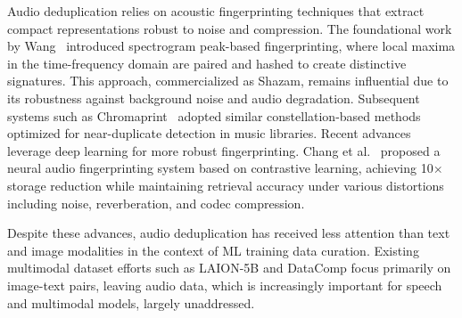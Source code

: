 \documentclass[sigconf, nonacm]{acmart}
\begin{document}
Audio deduplication relies on acoustic fingerprinting techniques that extract compact representations robust to noise and compression. The foundational work by Wang~\cite{wang2003industrial} introduced spectrogram peak-based fingerprinting, where local maxima in the time-frequency domain are paired and hashed to create distinctive signatures. This approach, commercialized as Shazam, remains influential due to its robustness against background noise and audio degradation. Subsequent systems such as Chromaprint~\cite{chromaprint} adopted similar constellation-based methods optimized for near-duplicate detection in music libraries. Recent advances leverage deep learning for more robust fingerprinting. Chang et al.~\cite{chang2021neural} proposed a neural audio fingerprinting system based on contrastive learning, achieving 10$\times$ storage reduction while maintaining retrieval accuracy under various distortions including noise, reverberation, and codec compression.  

Despite these advances, audio deduplication has received less attention than text and image modalities in the context of ML training data curation. Existing multimodal dataset efforts such as LAION-5B and DataComp focus primarily on image-text pairs, leaving audio data, which is increasingly important for speech and multimodal models, largely unaddressed.
\end{document}
